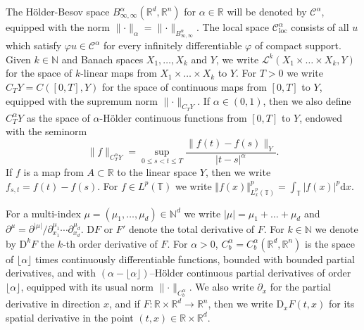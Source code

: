 \documentclass[a4paper,11pt]{article}
\newcommand{\cdummy}{\cdot}
\newcommand{\mathD}{\mathrm{D}}
\newcommand{\mathd}{\mathrm{d}}
\theoremstyle{remark}
\newcommand{\R}{\mathbb{R}}
\newcommand{\Lcal}{\mathcal{L}}
\newcommand{\CC}{\ensuremath{\mathscr{C}}}
\begin{document}
The H\"older-Besov space $B^\alpha_{\infty, \infty}(\R^d, \R^n)$ for $\alpha \in \R$ will be denoted by $\CC^\alpha$, equipped with the norm $\lVert \cdot \rVert_{\alpha}= \lVert \cdot \rVert_{B^\alpha_{\infty,\infty}}$. The local space $\CC^\alpha_\mathrm{loc}$ consists of all $u$ which satisfy $\varphi u \in \CC^\alpha$ for every infinitely differentiable $\varphi$ of compact support. %
Given $k \in \mathbb{N}$ and Banach spaces $X_{1} , \ldots ,X_{k}$ and $Y$, we write $\Lcal^{k} ( X_{1}\times \ldots \times X_{k} ,Y )$ for the space of $k$-linear maps from $X_{1} \times \ldots \times X_{k}$ to $Y$. %
For $T>0$ we write $C_{T} Y=C ( [ 0,T ] ,Y )$ for the space of continuous maps from $[ 0,T ]$ to $Y$, equipped with the supremum norm $\lVert \cdummy \rVert_{C_{T} Y}$. If $\alpha \in ( 0,1 )$, then we also define $C^{\alpha}_{T} Y$ as the space of $\alpha$-H{\"o}lder continuous functions from $[ 0,T ]$ to $Y$, endowed with the seminorm
\[
   \| f \|_{C^{\alpha}_{T} Y} = \sup_{0 \leqslant s<t \leqslant T} \frac{\| f( t ) -f ( s ) \|_{Y}}{| t-s |^{\alpha}}.
\]
If $f$ is a map from $A \subset \R$ to the linear space $Y$, then we write $f_{s,t} = f(t) - f(s)$. %
For  $f \in L^p(\mathbb{T})$ we write $\Vert  f(x) \Vert ^p_{L^p_x (\mathbb{T} )} = \int_{\mathbb{T}} | f ( x )|^p \mathd x$.

For a multi-index $\mu = ( \mu_{1} , \ldots , \mu_{d} ) \in \mathbb{N}^{d}$ we write $| \mu | = \mu_{1} + \ldots + \mu_{d}$ and $\partial^{\mu} = \partial^{| \mu |} / \partial_{x_{1}}^{\mu_{1}} \cdots \partial_{x_{d}}^{\mu_{d}}$. %
$\mathD F$ or $F'$ denote the total derivative of $F$. For $k \in \mathbb{N}$ we denote by $\mathD^{k} F$ the $k$-th order derivative of $F$. For $\alpha>0$, $C^{\alpha}_{b} =C^{\alpha}_{b} (\mathbb{R}^{d} ,\mathbb{R}^{n} )$ is the space of $\lfloor \alpha \rfloor$ times continuously differentiable functions, bounded with bounded partial derivatives, and with $(\alpha - \lfloor \alpha \rfloor)$--H\"older continuous partial derivatives of order $\lfloor \alpha \rfloor$, equipped with its usual norm $\lVert \cdot \rVert_{C^\alpha_b}$. %
We also write $\partial_{x}$ for the partial derivative in direction $x$, and if $F\colon \mathbb{R} \times\mathbb{R}^{d} \rightarrow \mathbb{R}^{n}$, then we write $\mathD_{x} F(t,x)$ for its spatial derivative in the point $( t,x ) \in \mathbb{R} \times \mathbb{R}^{d}$.
\end{document}

